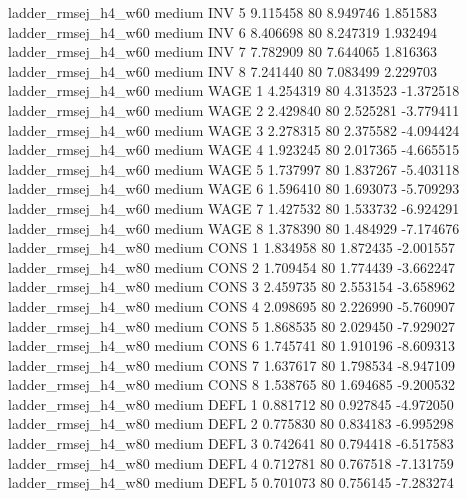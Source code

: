 ladder_rmsej_h4_w60     medium      INV                 5  9.115458 80       8.949746           1.851583
ladder_rmsej_h4_w60     medium      INV                 6  8.406698 80       8.247319           1.932494
ladder_rmsej_h4_w60     medium      INV                 7  7.782909 80       7.644065           1.816363
ladder_rmsej_h4_w60     medium      INV                 8  7.241440 80       7.083499           2.229703
ladder_rmsej_h4_w60     medium     WAGE                 1  4.254319 80       4.313523          -1.372518
ladder_rmsej_h4_w60     medium     WAGE                 2  2.429840 80       2.525281          -3.779411
ladder_rmsej_h4_w60     medium     WAGE                 3  2.278315 80       2.375582          -4.094424
ladder_rmsej_h4_w60     medium     WAGE                 4  1.923245 80       2.017365          -4.665515
ladder_rmsej_h4_w60     medium     WAGE                 5  1.737997 80       1.837267          -5.403118
ladder_rmsej_h4_w60     medium     WAGE                 6  1.596410 80       1.693073          -5.709293
ladder_rmsej_h4_w60     medium     WAGE                 7  1.427532 80       1.533732          -6.924291
ladder_rmsej_h4_w60     medium     WAGE                 8  1.378390 80       1.484929          -7.174676
ladder_rmsej_h4_w80     medium     CONS                 1  1.834958 80       1.872435          -2.001557
ladder_rmsej_h4_w80     medium     CONS                 2  1.709454 80       1.774439          -3.662247
ladder_rmsej_h4_w80     medium     CONS                 3  2.459735 80       2.553154          -3.658962
ladder_rmsej_h4_w80     medium     CONS                 4  2.098695 80       2.226990          -5.760907
ladder_rmsej_h4_w80     medium     CONS                 5  1.868535 80       2.029450          -7.929027
ladder_rmsej_h4_w80     medium     CONS                 6  1.745741 80       1.910196          -8.609313
ladder_rmsej_h4_w80     medium     CONS                 7  1.637617 80       1.798534          -8.947109
ladder_rmsej_h4_w80     medium     CONS                 8  1.538765 80       1.694685          -9.200532
ladder_rmsej_h4_w80     medium     DEFL                 1  0.881712 80       0.927845          -4.972050
ladder_rmsej_h4_w80     medium     DEFL                 2  0.775830 80       0.834183          -6.995298
ladder_rmsej_h4_w80     medium     DEFL                 3  0.742641 80       0.794418          -6.517583
ladder_rmsej_h4_w80     medium     DEFL                 4  0.712781 80       0.767518          -7.131759
ladder_rmsej_h4_w80     medium     DEFL                 5  0.701073 80       0.756145          -7.283274
